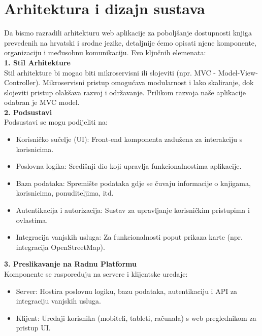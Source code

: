 \chapter{Arhitektura i dizajn sustava}
		
Da bismo razradili arhitekturu web aplikacije za poboljšanje dostupnosti knjiga prevedenih na hrvatski i srodne jezike, detaljnije ćemo opisati njene komponente, organizaciju i međusobnu komunikaciju. Evo ključnih elemenata:
	\\

        \textbf{1. Stil Arhitekture}\\
        Stil arhitekture bi mogao biti mikroservisni ili slojeviti (npr. MVC - Model-View-Controller). Mikroservisni pristup omogućava modularnost i lako skaliranje, dok slojeviti pristup olakšava razvoj i održavanje. Prilikom razvoja naše aplikacije odabran je MVC model.
        \\
        
        \textbf{2. Podsustavi}\\

        Podsustavi se mogu podijeliti na:
        \begin{itemize}
		  \item {Korisničko sučelje (UI): Front-end komponenta zadužena za interakciju s korisnicima.}
		  \item {Poslovna logika: Središnji dio koji upravlja funkcionalnostima aplikacije.}
		  \item {Baza podataka: Spremište podataka gdje se čuvaju informacije o knjigama, korisnicima, ponuditeljima, itd.}		
            \item {Autentikacija i autorizacija: Sustav za upravljanje korisničkim pristupima i ovlastima.}	
             \item {Integracija vanjskih usluga: Za funkcionalnosti poput prikaza karte (npr. integracija OpenStreetMap).}		
	   \end{itemize}

        \textbf{3. Preslikavanje na Radnu Platformu}\\

        Komponente se raspoređuju na servere i klijentske uređaje:
        \begin{itemize}
		  \item {Server: Hostira poslovnu logiku, bazu podataka, autentikaciju i API za integraciju vanjskih usluga.}
		  \item {Klijent: Uređaji korisnika (mobiteli, tableti, računala) s web preglednikom za pristup UI.}
	   \end{itemize}
    
